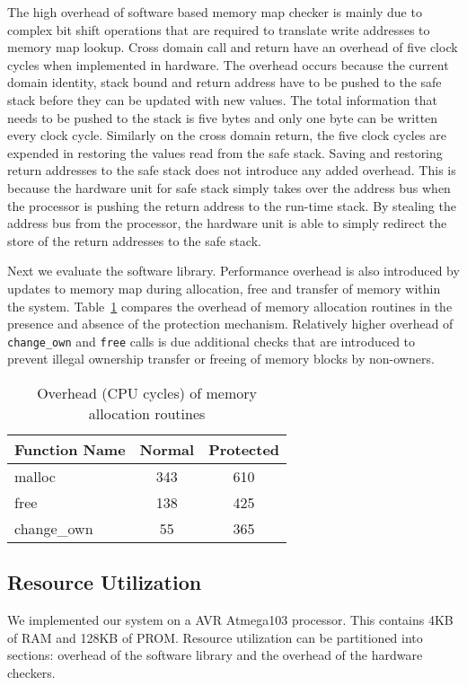 The high overhead of software based memory map checker is mainly due to complex bit shift operations that are required to translate write addresses to memory map lookup.
%
Cross domain call and return have an overhead of five clock cycles when implemented in hardware.
%
The overhead occurs because the current domain identity, stack bound and return address have to be pushed to the safe stack before they can be updated with new values.
%
The total information that needs to be pushed to the stack is five bytes and only one byte can be written every clock cycle.
%
Similarly on the cross domain return, the five clock cycles are expended in restoring the values read from the safe stack.
%
Saving and restoring return addresses to the safe stack does not introduce any added overhead.
%
This is because the hardware unit for safe stack simply takes over the address bus when the processor is pushing the return address to the run-time stack.
%
By stealing the address bus from the processor, the hardware unit is able to simply redirect the store of the return addresses to the safe stack.

Next we evaluate the software library.
%
Performance overhead is also introduced by updates to memory map during allocation, free and transfer of memory within the system.
%
Table~\ref{tab:malloc_comparison} compares the overhead of memory allocation routines in the presence and absence of the protection mechanism.
%
Relatively higher overhead of \texttt{change\_own} and \texttt{free} calls is due additional checks that are introduced to prevent illegal ownership transfer or freeing of memory blocks by non-owners.
%
\begin{table}[htdp]
\centering
\small{
\begin{tabular}{|l|c|c|}
	\hline
	Function Name & Normal & Protected \\
	\hline
	malloc  & 343 & 610\\
	free & 138 & 425\\
	change\_own & 55 & 365 \\
	\hline
\end{tabular}}
\caption{Overhead (CPU cycles) of memory allocation routines}
\label{tab:malloc_comparison}
\end{table}
%

\subsection{Resource Utilization}
%
We implemented our system on a AVR Atmega103 processor. This contains 4KB of RAM and 128KB of PROM.
%
Resource utilization can be partitioned into sections: 
overhead of the software library and the overhead of the hardware checkers.
%
%

